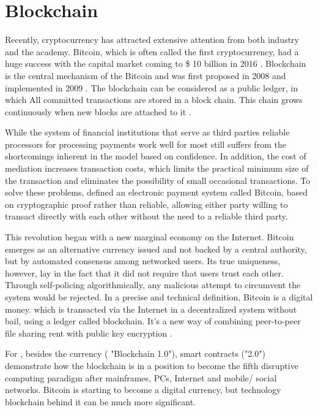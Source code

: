 \section{Blockchain}\label{sec:blockchain}
Recently, cryptocurrency has attracted extensive attention from both industry and the academy. Bitcoin, which is often called the first cryptocurrency, had a huge success with the capital market coming to \$ 10 billion in 2016 \cite{coindesk}. Blockchain is the central mechanism of the Bitcoin and was first proposed in 2008 and implemented in 2009 \cite{nakamoto2008bitcoin}. The blockchain can be considered as a public ledger, in which All committed transactions are stored in a block chain. This chain grows continuously when new blocks are attached to it \cite{zheng2016blockchain}.

While the system of financial institutions that serve as third parties reliable processors for processing payments work well for most still suffers from the shortcomings inherent in the model based on confidence. In addition, the cost of mediation increases transaction costs, which limits the practical minimum size of the transaction and eliminates the possibility of small occasional transactions. To solve these problems, \cite{nakamoto2008bitcoin} defined an electronic payment system called Bitcoin, based on cryptographic proof rather than reliable, allowing either party willing to transact directly with each other without the need to a reliable third party.

This revolution began with a new marginal economy on the Internet. Bitcoin emerges as an alternative currency issued and not backed by a central authority, but by automated consensus among networked users. Its true uniqueness, however, lay in the fact that it did not require that users trust each other. Through self-policing algorithmically, any malicious attempt to circumvent the system would be rejected. In a precise and technical definition, Bitcoin is a digital money. which is transacted via the Internet in a decentralized system without bail, using a ledger called blockchain. It's a new way of combining peer-to-peer file sharing rent with public key encryption \cite{swan2015blockchain}.

For \cite{swan2015blockchain}, besides the currency ( "Blockchain 1.0"), smart contracts ("2.0") demonstrate how the blockchain is in a position to become the fifth disruptive computing paradigm after mainframes, PCs, Internet and mobile/ social networks. Bitcoin is starting to become a digital currency, but technology blockchain behind it can be much more significant.

